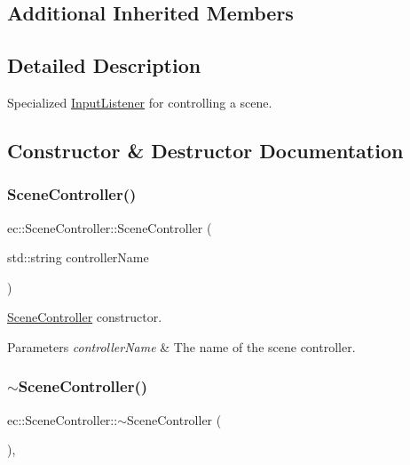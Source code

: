\subsection*{Additional Inherited Members}


\subsection{Detailed Description}
Specialized \mbox{\hyperlink{classec_1_1_input_listener}{Input\+Listener}} for controlling a scene. 

\subsection{Constructor \& Destructor Documentation}
\mbox{\label{classec_1_1_scene_controller_a97313b71165471f26f6e1bdec16392fd}} 
\subsubsection{\texorpdfstring{Scene\+Controller()}{SceneController()}}
{\footnotesize\ttfamily ec\+::\+Scene\+Controller\+::\+Scene\+Controller (\begin{DoxyParamCaption}\item[{std\+::string}]{controller\+Name }\end{DoxyParamCaption})\hspace{0.3cm}{\ttfamily [explicit]}}



\mbox{\hyperlink{classec_1_1_scene_controller}{Scene\+Controller}} constructor. 


\begin{DoxyParams}{Parameters}
{\em controller\+Name} & The name of the scene controller. \\
\hline
\end{DoxyParams}
\mbox{\label{classec_1_1_scene_controller_a48a2231bf316949cc1a8bc304ad5281c}} 
\subsubsection{\texorpdfstring{$\sim$\+Scene\+Controller()}{~SceneController()}}
{\footnotesize\ttfamily ec\+::\+Scene\+Controller\+::$\sim$\+Scene\+Controller (\begin{DoxyParamCaption}{ }\end{DoxyParamCaption})\hspace{0.3cm}{\ttfamily [virtual]}, {\ttfamily [default]}}



